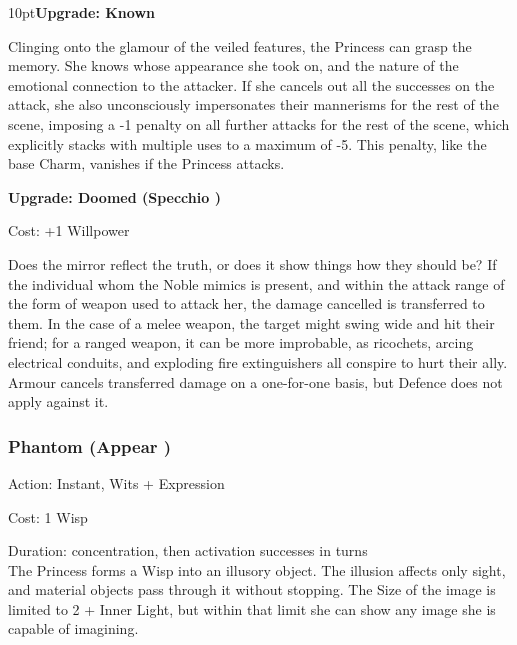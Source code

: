 \begin{myindentpar}{10pt}\textbf{Upgrade: Known}

Clinging onto the glamour of the veiled features, the Princess can grasp the memory. She knows whose appearance she took on, and the nature of the emotional connection to the attacker. If she cancels out all the successes on the attack, she also unconsciously impersonates their mannerisms for the rest of the scene, imposing a -1 penalty on all further attacks for the rest of the scene, which explicitly stacks with multiple uses to a maximum of -5. This penalty, like the base Charm, vanishes if the Princess attacks. 

\textbf{Upgrade: Doomed (Specchio \textbullet\textbullet\textbullet\textbullet)}

\noindent Cost: +1 Willpower

Does the mirror reflect the truth, or does it show things how they should be? If the individual whom the Noble mimics is present, and within the attack range of the form of weapon used to attack her, the damage cancelled is transferred to them. In the case of a melee weapon, the target might swing wide and hit their friend; for a ranged weapon, it can be more improbable, as ricochets, arcing electrical conduits, and exploding fire extinguishers all conspire to hurt their ally. Armour cancels transferred damage on a one-for-one basis, but Defence does not apply against it.\end{myindentpar}

\subsubsection*{Phantom (Appear \textbullet\textbullet)}
\noindent Action: Instant, Wits + Expression 

\noindent Cost: 1 Wisp

\noindent Duration: concentration, then activation successes in turns\\

\noindent The Princess forms a Wisp into an illusory object. The illusion affects only sight, and
material objects pass through it without stopping. The Size of the image is limited to 2 + Inner
Light, but within that limit she can show any image she is capable of imagining.

